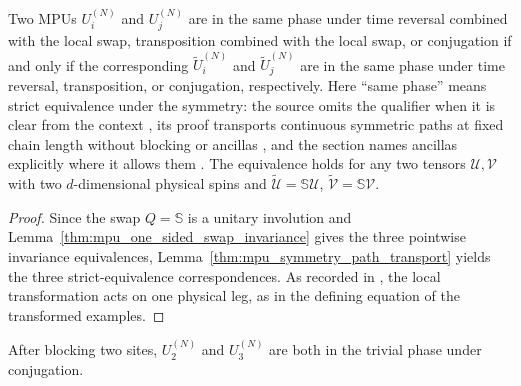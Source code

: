 \begin{lemma}
    \label{lemma:sym-trafo-swap}
    \leanok
    Two MPUs $U_i^{(N)}$ and $U_j^{(N)}$ are in the same phase under time
    reversal combined with the local swap, transposition combined with the
    local swap, or conjugation if and only if the corresponding
    $\widetilde U_i^{(N)}$ and $\widetilde U_j^{(N)}$ are in the same phase
    under time reversal, transposition, or conjugation, respectively.
    Here ``same phase'' means strict equivalence under the symmetry: the
    source omits the qualifier when it is clear from the context
    \cite[lines~725--730]{Cirac2017MPU}, its proof transports continuous
    symmetric paths at fixed chain length without blocking or ancillas
    \cite[lines~2071--2078]{Cirac2017MPU}, and the section names ancillas
    explicitly where it allows them \cite[line~2208]{Cirac2017MPU}. The
    equivalence holds for any two tensors $\mathcal U,\mathcal V$ with two
    $d$-dimensional physical spins and
    $\widetilde{\mathcal U}=\mathbb S\mathcal U$,
    $\widetilde{\mathcal V}=\mathbb S\mathcal V$.
\end{lemma}

\begin{proof}\leanok
    Since the swap $Q=\mathbb S$ is a unitary involution and
    Lemma~\ref{thm:mpu_one_sided_swap_invariance} gives the three
    pointwise invariance equivalences,
    Lemma~\ref{thm:mpu_symmetry_path_transport} yields the three
    strict-equivalence correspondences. As recorded in
    \cite{gap:mpu_swap_symmetry_one_sided}, the local transformation acts
    on one physical leg, as in the defining equation of the transformed
    examples.
\end{proof}

\begin{lemma}
    \label{prop:U2-U3-trivial-conjugation}
    \leanok
    After blocking two sites, $U_2^{(N)}$ and $U_3^{(N)}$ are both in the
    trivial phase under conjugation.
\end{lemma}

